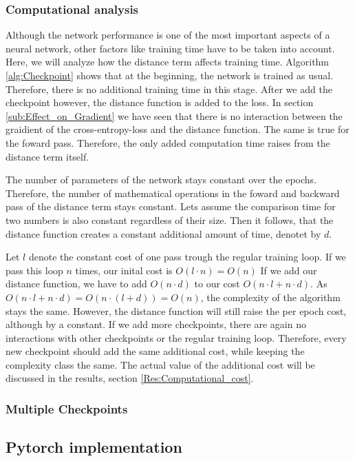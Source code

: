 \subsubsection{Computational analysis}\label{sub:Computational_Analysis}
Although the network performance is one of the most important aspects of a
neural network, other factors like training time have to be taken into account.
Here, we will analyze how the distance term affects training time. Algorithm
\ref{alg:Checkpoint} shows that at the beginning, the network is trained as
usual. Therefore, there is no additional training time in this stage. After we
add the checkpoint however, the distance function is added to the loss. In
section \ref{sub:Effect_on_Gradient} we have seen that there is no interaction
between the graidient of the cross-entropy-loss and the distance function. The
same is true for the foward pass. Therefore, the only added computation time
raises from the distance term itself.

The number of parameters of the network stays constant over the epochs.
Therefore, the number of mathematical operations in the foward and backward pass
of the distance term stays constant. Lets assume the comparison time for two
numbers is also constant regardless of their size. Then it follows, that the
distance function creates a constant additional amount of time, denotet by $d$. 

Let $l$ denote the constant cost of one pass trough the regular training loop.
If we pass this loop $n$ times, our inital cost is $O(l\cdot n)=O(n)$ If we add
our distance function, we have to add $O(n\cdot d)$ to our cost $O(n\cdot l + n
\cdot d)$. As $O(n\cdot l + n \cdot d)=O(n\cdot (l + d))=O(n)$, the complexity
of the algorithm stays the same. However, the distance function will still raise
the per epoch cost, although by a constant. If we add more checkpoints, there
are again no interactions with other checkpoints or the regular training loop.
Therefore, every new checkpoint should add the same additional cost, while
keeping the complexity class the same. The actual value of the additional cost
will be discussed in the results, section \ref{Res:Computational_cost}.


\subsubsection{Multiple Checkpoints}\label{sub:Multiple_checkpoints}

\subsection{Pytorch implementation}

